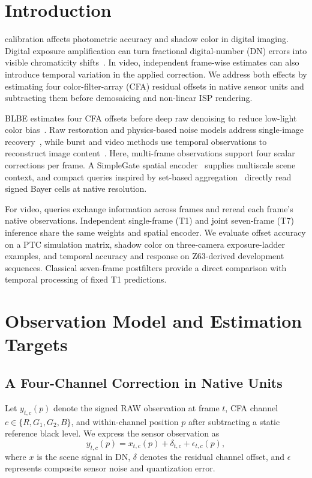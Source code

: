 \section{Introduction}
 calibration affects photometric accuracy and shadow color in digital imaging. Digital exposure amplification can turn fractional digital-number (DN) errors into visible chromaticity shifts~\cite{ptc_quant}. In video, independent frame-wise estimates can also introduce temporal variation in the applied correction. We address both effects by estimating four color-filter-array (CFA) residual offsets in native sensor units and subtracting them before demosaicing and non-linear ISP rendering.

BLBE estimates four CFA offsets before deep raw denoising to reduce low-light color bias~\cite{blbe}. Raw restoration and physics-based noise models address single-image recovery~\cite{sid,sidd,eld,noiseflow,unprocessing}, while burst and video methods use temporal observations to reconstruct image content~\cite{smd,fastdvd,crvd}. Here, multi-frame observations support four scalar corrections per frame. A SimpleGate spatial encoder~\cite{naf} supplies multiscale scene context, and compact queries inspired by set-based aggregation~\cite{set,perceiver} directly read signed Bayer cells at native resolution.

For video, queries exchange information across frames and reread each frame's native observations. Independent single-frame (T1) and joint seven-frame (T7) inference share the same weights and spatial encoder. We evaluate offset accuracy on a PTC simulation matrix, shadow color on three-camera exposure-ladder examples, and temporal accuracy and response on Z63-derived development sequences. Classical seven-frame postfilters provide a direct comparison with temporal processing of fixed T1 predictions.


\section{Observation Model and Estimation Targets}
\subsection{A Four-Channel Correction in Native Units}
Let $y_{t,c}(p)$ denote the signed RAW observation at frame $t$, CFA channel $c\in\{R,G_1,G_2,B\}$, and within-channel position $p$ after subtracting a static reference black level. We express the sensor observation as
\begin{equation}
 y_{t,c}(p)=x_{t,c}(p)+\delta_{t,c}+\epsilon_{t,c}(p),
 \label{eq:observation}
\end{equation}
where $x$ is the scene signal in DN, $\delta$ denotes the residual channel offset, and $\epsilon$ represents composite sensor noise and quantization error.

